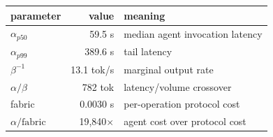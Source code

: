 \begin{tabular}{lrl}
\toprule
parameter & value & meaning \\
\midrule
$\alpha_{p50}$ & 59.5 s & median agent invocation latency \\
$\alpha_{p99}$ & 389.6 s & tail latency \\
$\beta^{-1}$ & 13.1 tok/s & marginal output rate \\
$\alpha/\beta$ & 782 tok & latency/volume crossover \\
fabric & 0.0030 s & per-operation protocol cost \\
$\alpha/\text{fabric}$ & 19,840$\times$ & agent cost over protocol cost \\
\bottomrule
\end{tabular}
